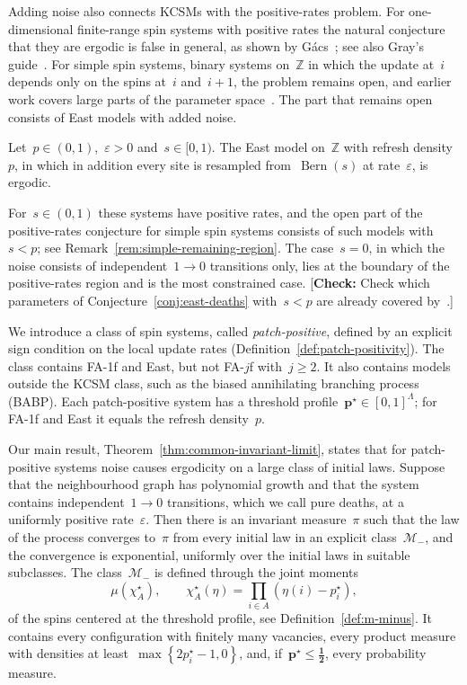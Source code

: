 \documentclass[EJP,preprint,NODS,nobera]{ejpecp}
\newcommand{\Z}{\mathbb{Z}}
\newcommand{\bb}[1]{\left(#1\right)}
\newcommand{\cb}[1]{\left\{#1\right\}}
\newcommand{\mb}[1]{\mathbf{#1}}
\newcommand{\mbs}[1]{\boldsymbol{#1}}
\newcommand{\authorcheck}[1]{{\color{blue}[\textbf{Check:} #1]}}
\begin{document}
Adding noise also connects KCSMs with the positive-rates problem. For
one-dimensional finite-range spin systems with positive rates the natural
conjecture that they are ergodic is false in general, as shown by
G\'acs~\cite{Gacs1986,Gacs2001}; see also Gray's guide~\cite{Gray2001}.
For simple spin systems, binary systems on~$\Z$ in which the update at~$i$
depends only on the spins at~$i$ and~$i+1$, the problem remains open, and
earlier work covers large parts of the parameter
space~\cite{GluchowskiMenz2025,GluchowskiMenz2026}. The part that remains
open consists of East models with added noise.

\begin{conjecture}
\label{conj:east-deaths}
Let~$p\in(0,1)$,~$\varepsilon>0$ and~$s\in[0,1)$. The East model on~$\Z$ with
refresh density~$p$, in which in addition every site is resampled
from~$\operatorname{Bern}(s)$ at rate~$\varepsilon$, is ergodic.
\end{conjecture}

For~$s\in(0,1)$ these systems have positive rates, and the open part of the
positive-rates conjecture for simple spin systems consists of such models
with~$s<p$; see Remark~\ref{rem:simple-remaining-region}. The case~$s=0$, in
which the noise consists of independent~$1\to0$ transitions only, lies at
the boundary of the positive-rates region and is the most constrained case.
\authorcheck{Check which parameters of Conjecture~\ref{conj:east-deaths}
with~$s<p$ are already covered by~\cite{GluchowskiMenz2025,GluchowskiMenz2026}.}

We introduce a class of spin systems, called \emph{patch-positive}, defined
by an explicit sign condition on the local update rates
(Definition~\ref{def:patch-positivity}). The class contains FA-1f and East,
but not FA-$j$f with~$j\geq2$. It also contains models outside the KCSM
class, such as the biased annihilating branching process (BABP). Each
patch-positive system has a threshold profile~$\mb p^\star\in[0,1]^\Lambda$;
for FA-1f and East it equals the refresh density~$p$.

Our main result, Theorem~\ref{thm:common-invariant-limit}, states that for
patch-positive systems noise causes ergodicity on a large class of initial
laws. Suppose that the neighbourhood graph has polynomial growth and that the
system contains independent~$1\to0$ transitions, which we call pure deaths,
at a uniformly positive rate~$\varepsilon$. Then there is an invariant
measure~$\pi$ such that the law of the process converges to~$\pi$ from every
initial law in an explicit class~$\mathcal M_-$, and the convergence is
exponential, uniformly over the initial laws in suitable subclasses. The
class~$\mathcal M_-$ is defined through the joint moments
\begin{equation*}
\mu\bb{\chi_A^\star},
\qquad
\chi_A^\star(\eta)
=
\prod_{i\in A}\bb{\eta(i)-p_i^\star},
\end{equation*}
of the spins centered at the threshold profile, see
Definition~\ref{def:m-minus}. It contains every configuration with finitely
many vacancies, every product measure with densities at
least~$\max\cb{2p_i^\star-1,0}$, and, if~$\mb p^\star\leq\mbs{\tfrac12}$,
every probability measure.
\end{document}
